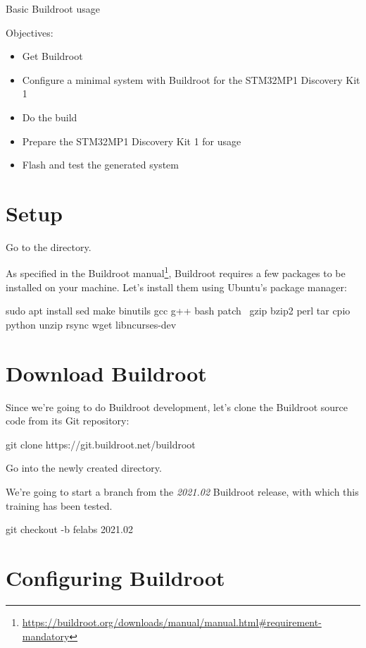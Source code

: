 \subchapter
{Basic Buildroot usage}
{Objectives:
  \begin{itemize}
  \item Get Buildroot
  \item Configure a minimal system with Buildroot for the STM32MP1 Discovery Kit 1
  \item Do the build
  \item Prepare the STM32MP1 Discovery Kit 1 for usage
  \item Flash and test the generated system
  \end{itemize}
}

\section{Setup}

Go to the  directory.

As specified in the Buildroot
manual\footnote{\url{https://buildroot.org/downloads/manual/manual.html\#requirement-mandatory}},
Buildroot requires a few packages to be installed on your
machine. Let's install them using Ubuntu's package manager:

\begin{bashinput}
sudo apt install sed make binutils gcc g++ bash patch \
  gzip bzip2 perl tar cpio python unzip rsync wget libncurses-dev
\end{bashinput}

\section{Download Buildroot}

Since we're going to do Buildroot development, let's clone the
Buildroot source code from its Git repository:

\begin{bashinput}
git clone https://git.buildroot.net/buildroot
\end{bashinput}

Go into the newly created  directory.

We're going to start a branch from the {\em 2021.02} Buildroot
release, with which this training has been tested.

\begin{bashinput}
git checkout -b felabs 2021.02
\end{bashinput}

\section{Configuring Buildroot}

